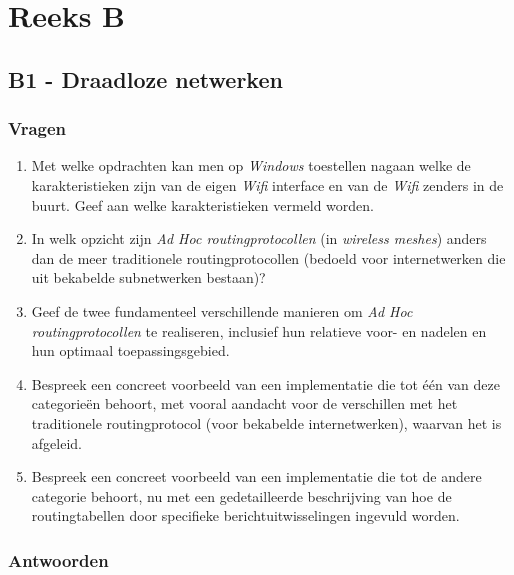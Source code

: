 \documentclass{report}
\begin{document}
\chapter{Reeks B}
\section{B1 - Draadloze netwerken}
\subsection{Vragen}
\begin{enumerate}
	\item Met welke opdrachten kan men op \textit{Windows} toestellen nagaan welke de karakteristieken zijn van de eigen \textit{Wifi} interface en van de \textit{Wifi} zenders in de buurt. Geef aan welke karakteristieken vermeld worden.
	\item In welk opzicht zijn \textit{Ad Hoc routingprotocollen} (in \textit{wireless meshes}) anders dan de meer traditionele routingprotocollen (bedoeld voor internetwerken die uit bekabelde subnetwerken bestaan)?
	\item Geef de twee fundamenteel verschillende manieren om \textit{Ad Hoc routingprotocollen} te realiseren, inclusief hun relatieve voor- en nadelen en hun optimaal toepassingsgebied.
	\item Bespreek een concreet voorbeeld van een implementatie die tot één van deze categorieën behoort, met vooral aandacht voor de verschillen met het traditionele routingprotocol (voor bekabelde internetwerken), waarvan het is afgeleid.
	\item Bespreek een concreet voorbeeld van een implementatie die tot de andere categorie behoort, nu met een gedetailleerde beschrijving van hoe de routingtabellen door specifieke berichtuitwisselingen ingevuld worden.
\end{enumerate}

\subsection{Antwoorden}
\end{document}
